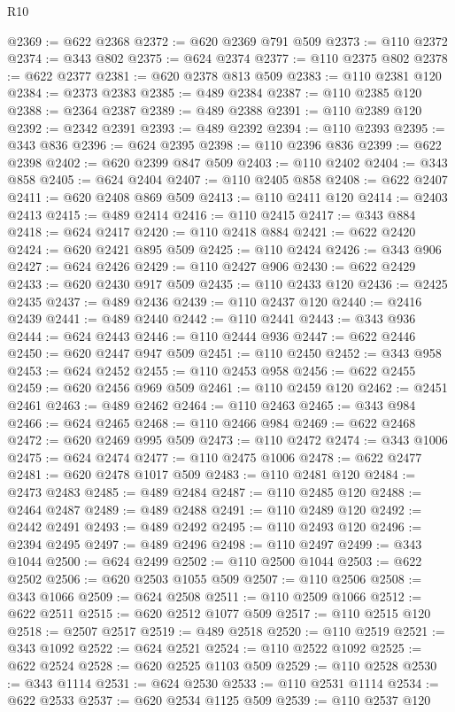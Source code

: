\begin{lexlean}{R10}
\begin{coremodule}
@2369 := @622 @2368
@2372 := @620 @2369 @791 @509
@2373 := @110 @2372
@2374 := @343 @802
@2375 := @624 @2374
@2377 := @110 @2375 @802
@2378 := @622 @2377
@2381 := @620 @2378 @813 @509
@2383 := @110 @2381 @120
@2384 := @2373 @2383
@2385 := @489 @2384
@2387 := @110 @2385 @120
@2388 := @2364 @2387
@2389 := @489 @2388
@2391 := @110 @2389 @120
@2392 := @2342 @2391
@2393 := @489 @2392
@2394 := @110 @2393
@2395 := @343 @836
@2396 := @624 @2395
@2398 := @110 @2396 @836
@2399 := @622 @2398
@2402 := @620 @2399 @847 @509
@2403 := @110 @2402
@2404 := @343 @858
@2405 := @624 @2404
@2407 := @110 @2405 @858
@2408 := @622 @2407
@2411 := @620 @2408 @869 @509
@2413 := @110 @2411 @120
@2414 := @2403 @2413
@2415 := @489 @2414
@2416 := @110 @2415
@2417 := @343 @884
@2418 := @624 @2417
@2420 := @110 @2418 @884
@2421 := @622 @2420
@2424 := @620 @2421 @895 @509
@2425 := @110 @2424
@2426 := @343 @906
@2427 := @624 @2426
@2429 := @110 @2427 @906
@2430 := @622 @2429
@2433 := @620 @2430 @917 @509
@2435 := @110 @2433 @120
@2436 := @2425 @2435
@2437 := @489 @2436
@2439 := @110 @2437 @120
@2440 := @2416 @2439
@2441 := @489 @2440
@2442 := @110 @2441
@2443 := @343 @936
@2444 := @624 @2443
@2446 := @110 @2444 @936
@2447 := @622 @2446
@2450 := @620 @2447 @947 @509
@2451 := @110 @2450
@2452 := @343 @958
@2453 := @624 @2452
@2455 := @110 @2453 @958
@2456 := @622 @2455
@2459 := @620 @2456 @969 @509
@2461 := @110 @2459 @120
@2462 := @2451 @2461
@2463 := @489 @2462
@2464 := @110 @2463
@2465 := @343 @984
@2466 := @624 @2465
@2468 := @110 @2466 @984
@2469 := @622 @2468
@2472 := @620 @2469 @995 @509
@2473 := @110 @2472
@2474 := @343 @1006
@2475 := @624 @2474
@2477 := @110 @2475 @1006
@2478 := @622 @2477
@2481 := @620 @2478 @1017 @509
@2483 := @110 @2481 @120
@2484 := @2473 @2483
@2485 := @489 @2484
@2487 := @110 @2485 @120
@2488 := @2464 @2487
@2489 := @489 @2488
@2491 := @110 @2489 @120
@2492 := @2442 @2491
@2493 := @489 @2492
@2495 := @110 @2493 @120
@2496 := @2394 @2495
@2497 := @489 @2496
@2498 := @110 @2497
@2499 := @343 @1044
@2500 := @624 @2499
@2502 := @110 @2500 @1044
@2503 := @622 @2502
@2506 := @620 @2503 @1055 @509
@2507 := @110 @2506
@2508 := @343 @1066
@2509 := @624 @2508
@2511 := @110 @2509 @1066
@2512 := @622 @2511
@2515 := @620 @2512 @1077 @509
@2517 := @110 @2515 @120
@2518 := @2507 @2517
@2519 := @489 @2518
@2520 := @110 @2519
@2521 := @343 @1092
@2522 := @624 @2521
@2524 := @110 @2522 @1092
@2525 := @622 @2524
@2528 := @620 @2525 @1103 @509
@2529 := @110 @2528
@2530 := @343 @1114
@2531 := @624 @2530
@2533 := @110 @2531 @1114
@2534 := @622 @2533
@2537 := @620 @2534 @1125 @509
@2539 := @110 @2537 @120

\end{coremodule}
\end{lexlean}
